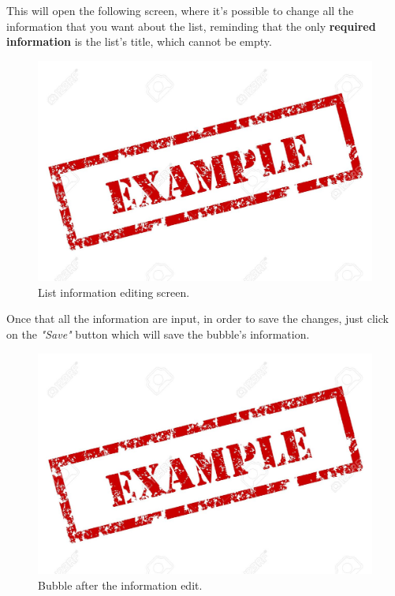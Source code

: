 This will open the following screen, where it's possible to change all the information that you want about the list, reminding that the only \textbf{required information} is the list's title, which cannot be empty.

\begin{figure}[H]
  \centering 
  \includegraphics[width=\textwidth]{Sections/3-HowToUse/Images/example.jpeg}
  \caption{List information editing screen.}
\end{figure}

Once that all the information are input, in order to save the changes, just click on the \textit{"Save"} button which will save the bubble's information.

\begin{figure}[H]
  \centering 
  \includegraphics[width=\textwidth]{Sections/3-HowToUse/Images/example.jpeg}
  \caption{Bubble after the information edit.}
\end{figure}